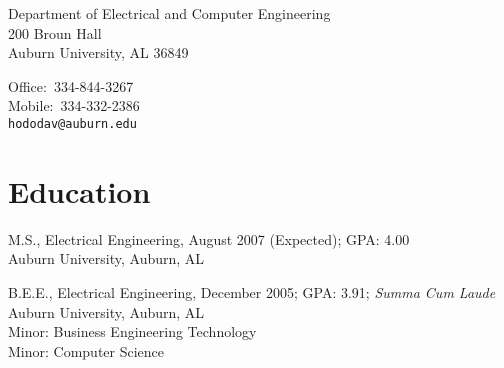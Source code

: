\vspace{-2cm}


\begin{resume}
\hspace{-0cm}
\begin{minipage}{1.25\linewidth}
  \begin{minipage}{0.49\linewidth}
    Department of Electrical and Computer Engineering \\
    200 Broun Hall \\
    Auburn University, AL 36849\\
  \end{minipage}%
  \hspace{\fill}%
  \begin{minipage}{0.49\linewidth}
  	\vspace{-4mm}
    Office:\ 334-844-3267 \\
    Mobile:\ 334-332-2386 \\
	{\tt hododav@auburn.edu}
  \end{minipage}
\end{minipage}


\vspace{-0.4cm}

\section{\sc Education}
M.S., Electrical Engineering, August 2007 (Expected); GPA: 4.00 \\
Auburn University, Auburn, AL

B.E.E., Electrical Engineering, December 2005; GPA: 3.91; \emph{Summa Cum Laude} \\
Auburn University, Auburn, AL \\
Minor: Business Engineering Technology\\
Minor: Computer Science


\end{resume}
